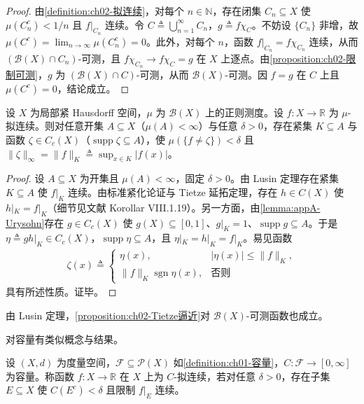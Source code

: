 \documentclass[../../main.tex]{subfiles}%
\begin{document}
\begin{proof}
由\cref{definition:ch02-拟连续}，对每个 $n\in\mathbb N$，存在闭集 $C_n\subseteq X$ 使 $\mu(C_n^c)<1/n$ 且 $f|_{C_n}$ 连续。令 $C\triangleq \bigcup_{n=1}^\infty C_n$，$g\triangleq f\chi_C$。不妨设 $\{C_n\}$ 非增，故 $\mu(C^c)=\lim_{n\to\infty}\mu(C_n^c)=0$。此外，对每个 $n$，函数 $f|_{C_n}=f\chi_{C_n}$ 连续，从而 $(\mathscr B(X)\cap C_n)$-可测，且 $f\chi_{C_n}\to f\chi_C=g$ 在 $X$ 上逐点。由\cref{proposition:ch02-限制可测}，$g$ 为 $(\mathscr B(X)\cap C)$-可测，从而 $\mathscr B(X)$-可测。因 $f=g$ 在 $C$ 上且 $\mu(C^c)=0$，结论成立。
\end{proof}

\begin{proposition}\label{proposition:ch02-Tietze逼近}\label{proposition:ch02-连续逼近}
设 $X$ 为局部紧 Hausdorff 空间，$\mu$ 为 $\mathscr B(X)$ 上的正则测度。设 $f:X\to\mathbb R$ 为 $\mu$-拟连续。则对任意开集 $A\subseteq X$（$\mu(A)<\infty$）与任意 $\delta>0$，存在紧集 $K\subseteq A$ 与函数 $\zeta\in C_c(X)$（$\operatorname{supp}\zeta\subseteq A$），使 $\mu(\{f\neq\zeta\})<\delta$ 且 $\|\zeta\|_\infty=\|f\|_K\triangleq \sup_{x\in K}|f(x)|$。
\end{proposition}

\begin{proof}
设 $A\subseteq X$ 为开集且 $\mu(A)<\infty$，固定 $\delta>0$。由 Lusin 定理存在紧集 $K\subseteq A$ 使 $f|_K$ 连续。由标准紧化论证与 Tietze 延拓定理，存在 $h\in C(X)$ 使 $h|_K=f|_K$（细节见文献\cite{ref45} Korollar VIII.1.19）。另一方面，由\cref{lemma:appA-Urysohn}存在 $g\in C_c(X)$ 使 $g(X)\subseteq[0,1]$、$g|_K=1$、$\operatorname{supp}g\subseteq A$。于是 $\eta\triangleq gh|_K\in C_c(X)$，$\operatorname{supp}\eta\subseteq A$，且 $\eta|_K=h|_K=f|_K$。易见函数
\begin{align*}
\zeta(x)\triangleq 
\begin{cases}
\eta(x), & |\eta(x)|\leqslant\|f\|_K,\\
\|f\|_K\operatorname{sgn}\eta(x), & \text{否则}
\end{cases}
\end{align*}
具有所述性质。证毕。
\end{proof}

\begin{remark}\label{remark:ch02-Lusin对可测函数}
由 Lusin 定理，\cref{proposition:ch02-Tietze逼近}对 $\mathscr B(X)$-可测函数也成立。
\end{remark}

对容量有类似概念与结果。

\begin{definition}\label{definition:ch02-C拟连续}
设 $(X,d)$ 为度量空间，$\mathscr F\subseteq\mathscr P(X)$ 如\cref{definition:ch01-容量}，$C:\mathscr F\to[0,\infty]$ 为容量。称函数 $f:X\to\mathbb R$ 在 $X$ 上为 $C$-拟连续，若对任意 $\delta>0$，存在子集 $E\subseteq X$ 使 $C(E^c)<\delta$ 且限制 $f|_E$ 连续。
\end{definition}
\end{document}
